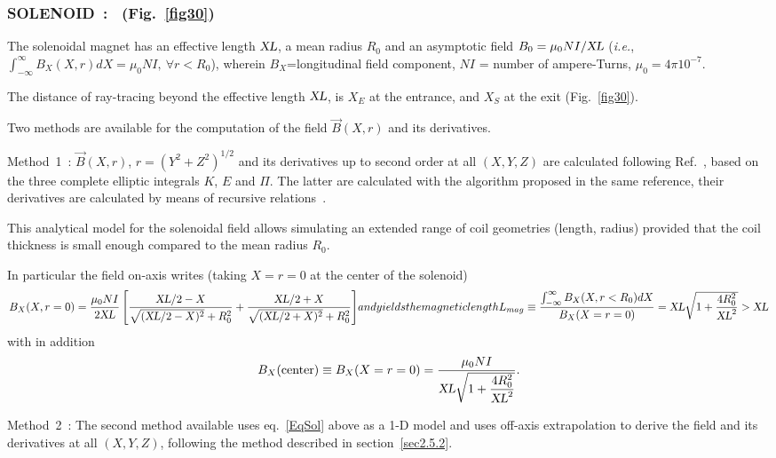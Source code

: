 \newpage

\subsubsection*{SOLENOID~: \SOLENOIDTitl\ (Fig.~\protect\ref{fig30}) } \label{SOLENOID}  
\medskip 

 The solenoidal magnet has an effective length $ \textsl{XL}$,  a mean radius
$ R_0 $ and an asymptotic field  $ B_0=\mu_0 N I / \textsl{XL}$ (\emph{i.e.}, $\int_{-\infty}^\infty 
B_X(X,r) dX = \mu_0 N I, ~\forall r<R_0$), wherein $B_X$=longitudinal field component, 
$ NI $  = number of ampere-Turns, $\mu_0=4\pi  10^{-7} $. 
\medskip

\noindent The distance of ray-tracing beyond the effective length $ \textsl{XL}$,   is 
$X_E $ at the entrance, and $ X_S $ at the exit (Fig.~\ref{fig30}).   
\medskip

\noindent Two methods are available for the computation of the field $ \vec  B(X,r)$ and its derivatives. 


\noindent Method~1~:   $ \vec  B(X,r)$, $r=(Y^2+Z^2)^{1/2} $ and its derivatives up to 
second order  at all $(X,Y,Z)$ are calculated following Ref.~\cite{Biblio17}, %
based on the three complete elliptic integrals $K$, $E $ and $\Pi$. The latter 
are calculated with the algorithm proposed in the same reference, their
derivatives are calculated by means of recursive relations~\cite{Biblio18}.  %

\medskip

\noindent This analytical model for the solenoidal field allows simulating an 
extended range of coil geometries (length, radius) 
provided that the coil thickness is small enough compared to the mean radius $ R_0 $. 
\medskip


\noindent In particular the field on-axis writes (taking $X=r=0$ at the center of the  solenoid) 
\begin{equation}
B_X(X,r=0) = \dfrac{\mu_0 N I }{2 \XL} \left[ \dfrac{\XL/2-X}{\sqrt{(\XL/2-X)^2}+R_0^2} 
+  \dfrac{\XL/2+X}{\sqrt{(\XL/2+X)^2}+R_0^2} \right]$$ 
 and yields the magnetic length 
$$L_{mag} \equiv  \dfrac{\int_{-\infty}^\infty B_X(X,r<R_0) dX }{B_X(X=r=0)} 
= \XL\sqrt{1+\dfrac{4R_0^2 }{\XL^2}} > \XL 
\label{EqSol}
\end{equation}
with in addition 
$$B_X(\textrm{center}) \equiv B_X(X=r=0) = 
      \dfrac{\mu_0 N I }{\textsl{XL}\sqrt{1+\dfrac{4R_0^2}{\textsl{XL}^2}}}.$$

\bigskip

\noindent Method~2~:  The second method available uses eq.~\ref{EqSol} above as a 1-D model and uses off-axis 
extrapolation to derive the field  and its derivatives at all $(X,Y,Z)$, following the method 
described in section~\ref{sec2.5.2}. 


